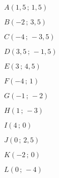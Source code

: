      \begin{colitemize}{2}
        \item \blue $A(1,5\,;\,1,5)$
        \item \blue $B(-2\,;\,3,5)$
        \item \blue $C(-4\,;\,-3,5)$
        \item \blue $D(3,5\,;\,-1,5)$
        \item \blue $E(3\,;\,4,5)$
        \item \blue $F(-4\,;\,1)$
        \item \blue $G(-1\,;\,-2)$
        \item \blue $H(1\,;\,-3)$
        \item \blue $I(4\,;\,0)$
        \item \blue $J(0\,;\,2,5)$
        \item \blue $K(-2\,;\,0)$
        \item \blue $L(0\,;\,-4)$
     \end{colitemize}
